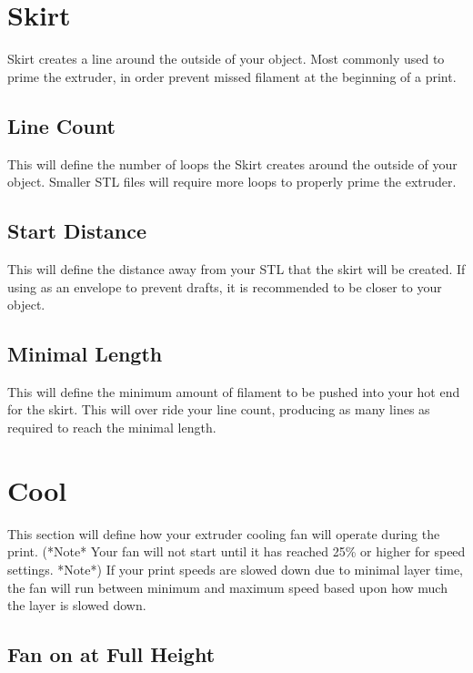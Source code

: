 \section{Skirt}

Skirt creates a line around the outside of your object. Most commonly used to prime the extruder, in order prevent missed filament at the beginning of a print.

\subsection{Line Count}

This will define the number of loops the Skirt creates around the outside of your object. Smaller STL files will require more loops to properly prime the extruder.

\subsection{Start Distance}

This will define the distance away from your STL that the skirt will be created. If using as an envelope to prevent drafts, it is recommended to be closer 	to your object.

\subsection{Minimal Length}

This will define the minimum amount of filament to be pushed into your hot end for the skirt. This will over ride your line count, producing as many lines as required to reach the minimal length.

\section{Cool}

This section will define how your extruder cooling fan will operate during the print. 	(*Note* Your fan will not start until it has reached 25\% or higher for speed settings. *Note*) If your print speeds are slowed down due to minimal layer time, the fan will run between minimum and maximum speed based upon how much the layer is slowed down.

\subsection{Fan on at Full Height}

